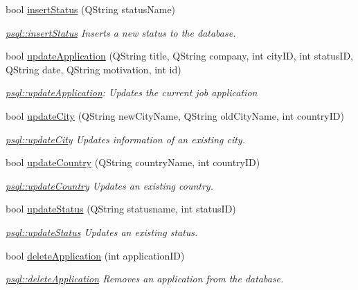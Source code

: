 \begin{DoxyCompactItemize}
bool \hyperlink{classpsql_a601ee0bdc9430b1d674a857f7c94b767}{insert\+Status} (Q\+String status\+Name)
\begin{DoxyCompactList}\small\item\em \hyperlink{classpsql_a601ee0bdc9430b1d674a857f7c94b767}{psql\+::insert\+Status} Inserts a new status to the database. \end{DoxyCompactList}\item 
bool \hyperlink{classpsql_a836eea3c6deb2d6a3a357193a99d6ee7}{update\+Application} (Q\+String title, Q\+String company, int city\+ID, int status\+ID, Q\+String date, Q\+String motivation, int id)
\begin{DoxyCompactList}\small\item\em \hyperlink{classpsql_a836eea3c6deb2d6a3a357193a99d6ee7}{psql\+::update\+Application}\+: Updates the current job application \end{DoxyCompactList}\item 
bool \hyperlink{classpsql_af2d88341e21459895470da26fa1826f0}{update\+City} (Q\+String new\+City\+Name, Q\+String old\+City\+Name, int country\+ID)
\begin{DoxyCompactList}\small\item\em \hyperlink{classpsql_af2d88341e21459895470da26fa1826f0}{psql\+::update\+City} Updates information of an existing city. \end{DoxyCompactList}\item 
bool \hyperlink{classpsql_ae662278c5fb8ff3471ee1442e69482e2}{update\+Country} (Q\+String country\+Name, int country\+ID)
\begin{DoxyCompactList}\small\item\em \hyperlink{classpsql_ae662278c5fb8ff3471ee1442e69482e2}{psql\+::update\+Country} Updates an existing country. \end{DoxyCompactList}\item 
bool \hyperlink{classpsql_a620364c99c98e20720908deb045536a0}{update\+Status} (Q\+String statusname, int status\+ID)
\begin{DoxyCompactList}\small\item\em \hyperlink{classpsql_a620364c99c98e20720908deb045536a0}{psql\+::update\+Status} Updates an existing status. \end{DoxyCompactList}\item 
bool \hyperlink{classpsql_a999ee8e2d813892411ef502ebc055a79}{delete\+Application} (int application\+ID)
\begin{DoxyCompactList}\small\item\em \hyperlink{classpsql_a999ee8e2d813892411ef502ebc055a79}{psql\+::delete\+Application} Removes an application from the database. \end{DoxyCompactList}\item 

\end{DoxyCompactItemize}
